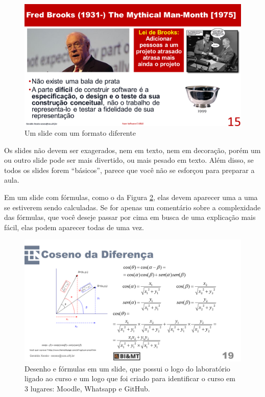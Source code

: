 \documentclass{article}
\def\tam{0.5}
\begin{document}
\begin{figure}[htb]
    \centering
    \includegraphics[width=\tam\linewidth]{imagens/manmonth.png}
    \caption{Um slide com um formato diferente}
    \label{fig:man}
\end{figure}


Os slides não devem ser exagerados, nem em texto, nem em decoração, porém um ou outro slide pode ser mais divertido, ou mais pesado em texto. Além disso, se todos os slides forem ``básicos'', parece que você não se esforçou para preparar a aula.

Em um slide com fórmulas, como o da Figura \ref{fig:formulas}, elas devem aparecer uma a uma se estiverem sendo calculadas.
Se for apenas um comentário sobre a complexidade das fórmulas, que você deseje passar por cima em busca de uma explicação mais fácil, elas podem aparecer todas de uma vez.

\begin{figure}[hbt]
    \centering
    \includegraphics[width=\tam\linewidth]{imagens/desenhoeformulas.png}
    \caption{Desenho e fórmulas em um slide, que possui o logo do laboratório ligado ao curso e um logo que foi criado para identificar o curso em 3 lugares: Moodle, Whatsapp e GitHub.}
    \label{fig:formulas}
\end{figure}
\end{document}
